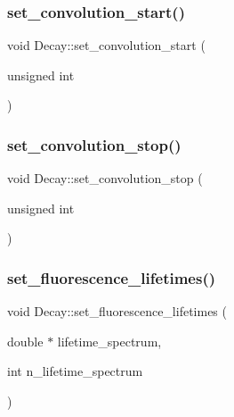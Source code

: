 \mbox{\label{class_decay_a9d989db5da823f4eb62b2bed6f20cd3d}} 
\subsubsection{\texorpdfstring{set\+\_\+convolution\+\_\+start()}{set\_convolution\_start()}}
{\footnotesize\ttfamily void Decay\+::set\+\_\+convolution\+\_\+start (\begin{DoxyParamCaption}\item[{unsigned}]{int }\end{DoxyParamCaption})}

\mbox{\label{class_decay_a1ea9444adcde465036893d3ffd192e0c}} 
\subsubsection{\texorpdfstring{set\+\_\+convolution\+\_\+stop()}{set\_convolution\_stop()}}
{\footnotesize\ttfamily void Decay\+::set\+\_\+convolution\+\_\+stop (\begin{DoxyParamCaption}\item[{unsigned}]{int }\end{DoxyParamCaption})}

\mbox{\label{class_decay_aaf3a26b7bce1d44a5330a636a0d87654}} 
\subsubsection{\texorpdfstring{set\+\_\+fluorescence\+\_\+lifetimes()}{set\_fluorescence\_lifetimes()}}
{\footnotesize\ttfamily void Decay\+::set\+\_\+fluorescence\+\_\+lifetimes (\begin{DoxyParamCaption}\item[{double $\ast$}]{lifetime\+\_\+spectrum,  }\item[{int}]{n\+\_\+lifetime\+\_\+spectrum }\end{DoxyParamCaption})}

